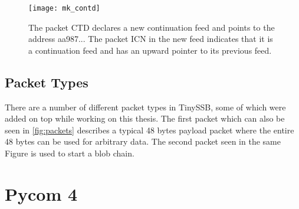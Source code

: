 \begin{figure}
\centering
\texttt{[image: mk\_contd]}
\caption{The packet CTD declares a new continuation feed and points to the address aa987... The packet ICN in the new feed indicates that it is a continuation feed and has an upward pointer to its previous feed.}
\label{fig:mk_contd}
\end{figure}

\subsection{Packet Types}

There are a number of different packet types in TinySSB, some of which were added on top while working on this thesis.
The first packet which can also be seen in \cref{fig:packets} describes a typical 48 bytes payload packet where the entire 48 bytes can be used for arbitrary data. The second packet seen in the same Figure is used to start a blob chain. 









\section{Pycom 4}





